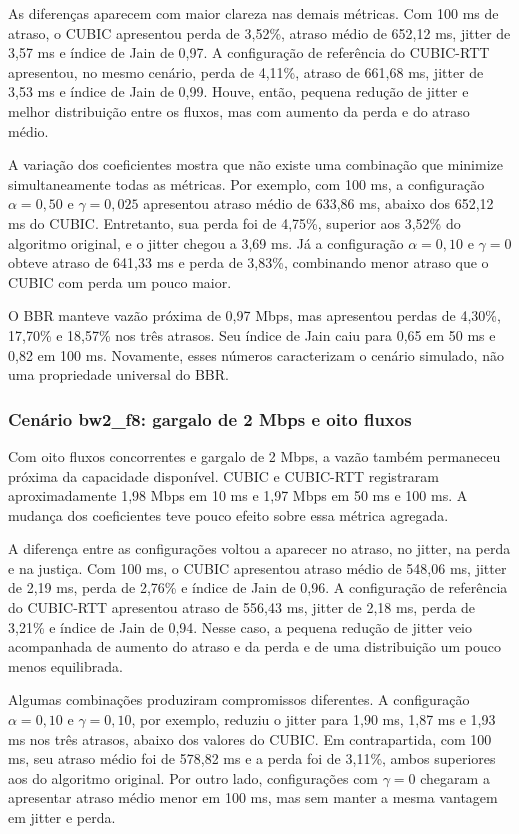 \documentclass[a4paper,12pt]{monografia}
\begin{document}
As diferenças aparecem com maior clareza nas demais métricas. Com 100 ms de atraso, o CUBIC apresentou perda de 3,52\%, atraso médio de 652,12 ms, jitter de 3,57 ms e índice de Jain de 0,97. A configuração de referência do CUBIC-RTT apresentou, no mesmo cenário, perda de 4,11\%, atraso de 661,68 ms, jitter de 3,53 ms e índice de Jain de 0,99. Houve, então, pequena redução de jitter e melhor distribuição entre os fluxos, mas com aumento da perda e do atraso médio.

A variação dos coeficientes mostra que não existe uma combinação que minimize simultaneamente todas as métricas. Por exemplo, com 100 ms, a configuração $\alpha=0{,}50$ e $\gamma=0{,}025$ apresentou atraso médio de 633,86 ms, abaixo dos 652,12 ms do CUBIC. Entretanto, sua perda foi de 4,75\%, superior aos 3,52\% do algoritmo original, e o jitter chegou a 3,69 ms. Já a configuração $\alpha=0{,}10$ e $\gamma=0$ obteve atraso de 641,33 ms e perda de 3,83\%, combinando menor atraso que o CUBIC com perda um pouco maior.

O BBR manteve vazão próxima de 0,97 Mbps, mas apresentou perdas de 4,30\%, 17,70\% e 18,57\% nos três atrasos. Seu índice de Jain caiu para 0,65 em 50 ms e 0,82 em 100 ms. Novamente, esses números caracterizam o cenário simulado, não uma propriedade universal do BBR.

\subsubsection{Cenário bw2\_f8: gargalo de 2 Mbps e oito fluxos}

Com oito fluxos concorrentes e gargalo de 2 Mbps, a vazão também permaneceu próxima da capacidade disponível. CUBIC e CUBIC-RTT registraram aproximadamente 1,98 Mbps em 10 ms e 1,97 Mbps em 50 ms e 100 ms. A mudança dos coeficientes teve pouco efeito sobre essa métrica agregada.

A diferença entre as configurações voltou a aparecer no atraso, no jitter, na perda e na justiça. Com 100 ms, o CUBIC apresentou atraso médio de 548,06 ms, jitter de 2,19 ms, perda de 2,76\% e índice de Jain de 0,96. A configuração de referência do CUBIC-RTT apresentou atraso de 556,43 ms, jitter de 2,18 ms, perda de 3,21\% e índice de Jain de 0,94. Nesse caso, a pequena redução de jitter veio acompanhada de aumento do atraso e da perda e de uma distribuição um pouco menos equilibrada.

Algumas combinações produziram compromissos diferentes. A configuração $\alpha=0{,}10$ e $\gamma=0{,}10$, por exemplo, reduziu o jitter para 1,90 ms, 1,87 ms e 1,93 ms nos três atrasos, abaixo dos valores do CUBIC. Em contrapartida, com 100 ms, seu atraso médio foi de 578,82 ms e a perda foi de 3,11\%, ambos superiores aos do algoritmo original. Por outro lado, configurações com $\gamma=0$ chegaram a apresentar atraso médio menor em 100 ms, mas sem manter a mesma vantagem em jitter e perda.
\end{document}
